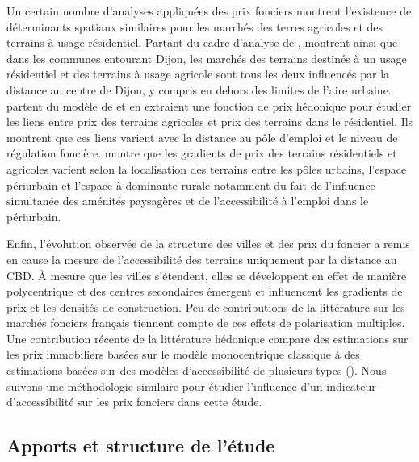 \documentclass[10.5pt,a4paper]{article}
\begin{document}
{Un certain nombre d'analyses appliquées des prix fonciers montrent l'existence de déterminants spatiaux similaires pour les marchés des terres agricoles et des terrains à usage résidentiel. Partant du cadre d'analyse  de \cite{Capozza89}, \cite{Cava03} montrent ainsi que dans les communes entourant Dijon, les marchés des terrains destinés à un usage résidentiel et des terrains à usage agricole sont tous les deux influencés par la distance au centre de Dijon, y compris en dehors des limites de l'aire urbaine.  \cite{Geniaux05} partent du modèle de \cite{Capozza89} et en extraient une fonction de prix hédonique pour étudier les liens entre prix des terrains agricoles et prix des terrains dans le résidentiel. Ils montrent que ces liens varient avec la distance au pôle d'emploi et le niveau de régulation foncière. \cite{Lecat04} montre que les gradients de prix des terrains résidentiels et agricoles varient selon la localisation des terrains entre les pôles urbains, l'espace périurbain et l'espace à dominante rurale notamment du fait de l'influence simultanée des aménités paysagères et de l'accessibilité à l'emploi dans le périurbain. \par

Enfin, l'évolution observée de la structure des villes et des prix du foncier a remis en cause la mesure de l'accessibilité des terrains uniquement par la distance au CBD.  \`{A} mesure que les villes s'étendent, elles se développent en effet de manière polycentrique et des centres secondaires émergent et influencent les gradients de prix et les densités de construction. 
Peu de contributions de la littérature sur les marchés fonciers français tiennent compte de ces effets de polarisation multiples. Une contribution récente de la littérature hédonique compare des estimations sur les prix immobiliers basées sur le modèle monocentrique classique à des estimations basées sur des modèles d'accessibilité de plusieurs types (\cite{Gasch_etal11}). Nous suivons une méthodologie similaire pour étudier l'influence d'un indicateur d'accessibilité sur les prix fonciers dans cette étude. \par

\subsection{Apports et structure de l'étude}

}
\end{document}
